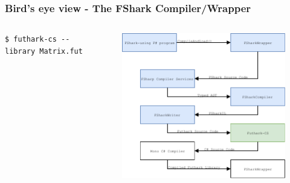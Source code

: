 \documentclass[10pt, compress, usenames, dvipsnames]{beamer}
\begin{document}
\begin{frame}[fragile]
  \frametitle{Bird's eye view - The FShark Compiler/Wrapper}
\begin{columns}[t] %
\begin{column}{.38\textwidth}
    \begin{verbatim}
$ futhark-cs --library Matrix.fut
    \end{verbatim}
\end{column}
\hfill
\begin{column}{.60\textwidth}
  \begin{figure}
    \includegraphics[scale=0.7]{./images/pipeline/pipeline7}
  \end{figure}
\end{column}
\end{columns}
\end{frame}
\end{document}
